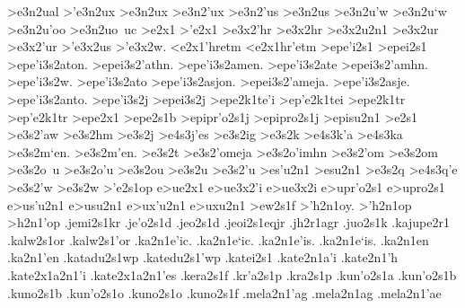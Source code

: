 {	>e3n2ual
	>'e3n2ux    		%
	>e3n2ux 		%
	>e3n2'ux		%
	>e3n2'us    		%
	>e3n2us
	>e3n2u'w    		%
	>e3n2u`w
	>e3n2u'oo
	>e3n2uo~uc
>e2x1
>'e2x1
	>e3x2'hr   		%
	>e3x2hr 		%
	>e3x2u2n1   		%
	>e3x2ur     		%
	>e3x2'ur  		%
	>'e3x2us  		%
	>'e3x2w.
<e2x1'hretm		%
<e2x1hr'etm
>epe'i2s1 		%
>epei2s1
	>epe'i3s2aton.	%
	>epei3s2'athn.
	>epe'i3s2amen.
	>epe'i3s2ate
	>epei3s2'amhn.
	>epe'i3s2w.
	>epe'i3s2ato
	>epe'i3s2asjon.
	>epei3s2'ameja.
	>epe'i3s2asje.
	>epe'i3s2anto.
	>epe'i3s2j	%
	>epei3s2j
>epe2k1te'i 		%
>ep'e2k1tei
>epe2k1tr 		%
>ep'e2k1tr
>epe2x1
>epe2s1b 		%
>epipr'o2s1j		%
>epipro2s1j
>episu2n1  		%
>e2s1
	>e3s2'aw 		%
	>e3s2hm  		%
	>e3s2j 			%
		>e4s3j'es 		%
	>e3s2ig 		%
	>e3s2k
		>e4s3k'a 		%
		>e4s3ka  		%
%
	>e3s2m`en.  >e3s2m'en.	%
	>e3s2t
	>e3s2'omeja
	>e3s2o'imhn
	>e3s2'om		%
	>e3s2om
	>e3s2o~u 		%
	>e3s2o'u %
    >e3s2ou %
%
	>e3s2u  		%
	>e3s2'u
	>es'u2n1 		%
	>esu2n1
	>e3s2q
		>e4s3q'e		%
	>e3s2'w
	>e3s2w
>'e2s1op 		%
e>ue2x1  		%
	e>ue3x2'i 		%
	e>ue3x2i
e>upr'o2s1 		%
e>upro2s1
e>us'u2n1 		%
e>usu2n1
e>ux'u2n1 		%
e>uxu2n1
>ew2s1f   		%
>'h2n1oy.		%
>'h2n1op
>h2n1'op
.jemi2s1kr  %
.je'o2s1d   %
.jeo2s1d
.jeoi2s1eqjr		%
.jh2r1agr  		%
.juo2s1k     		%
.kajupe2r1 		%
.kalw2s1or 	 	%
.kalw2s1'or
.ka2n1e'ic.		%
.ka2n1e`ic.
.ka2n1e'is.
.ka2n1e`is.
.ka2n1en
.ka2n1'en		
.katadu2s1wp 		%
.katedu2s1'wp  		%
.katei2s1 		%
.kate2n1a'i 		%
.kate2n1'h 		%
.kate2x1a2n1'i 		%
.kate2x1a2n1'es   	%
.kera2s1f 		%
.kr'a2s1p 		%
.kra2s1p
.kun'o2s1a 		%
.kun'o2s1b 		%
.kuno2s1b
.kun'o2s1o 		%
.kuno2s1o
.kuno2s1f  		%
.mela2n1'ag			%
.mela2n1ag
.mela2n1'ae			%
}

